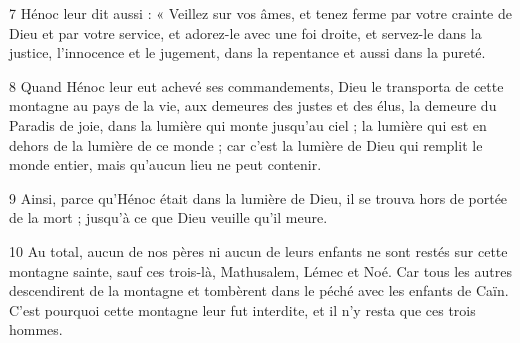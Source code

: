 \par 7 Hénoc leur dit aussi : « Veillez sur vos âmes, et tenez ferme par votre crainte de Dieu et par votre service, et adorez-le avec une foi droite, et servez-le dans la justice, l'innocence et le jugement, dans la repentance et aussi dans la pureté.

\par 8 Quand Hénoc leur eut achevé ses commandements, Dieu le transporta de cette montagne au pays de la vie, aux demeures des justes et des élus, la demeure du Paradis de joie, dans la lumière qui monte jusqu'au ciel ; la lumière qui est en dehors de la lumière de ce monde ; car c'est la lumière de Dieu qui remplit le monde entier, mais qu'aucun lieu ne peut contenir.

\par 9 Ainsi, parce qu'Hénoc était dans la lumière de Dieu, il se trouva hors de portée de la mort ; jusqu'à ce que Dieu veuille qu'il meure.

\par 10 Au total, aucun de nos pères ni aucun de leurs enfants ne sont restés sur cette montagne sainte, sauf ces trois-là, Mathusalem, Lémec et Noé. Car tous les autres descendirent de la montagne et tombèrent dans le péché avec les enfants de Caïn. C'est pourquoi cette montagne leur fut interdite, et il n'y resta que ces trois hommes.


